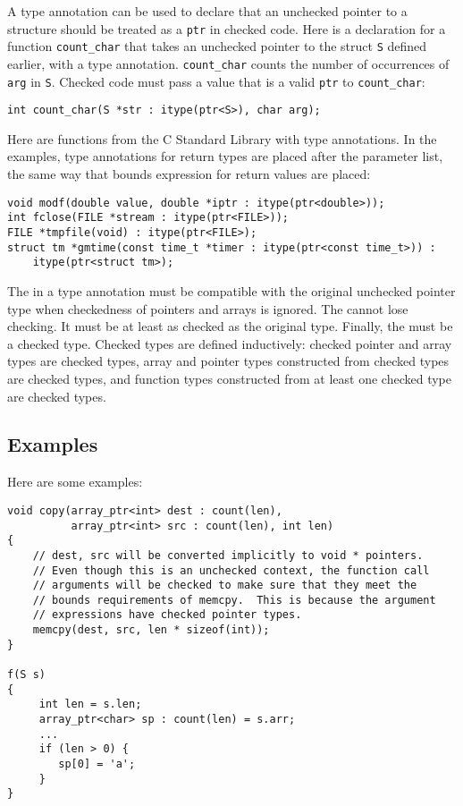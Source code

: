 A type annotation can be used to declare that an unchecked
pointer to a structure should be treated as a \verb+ptr+ in
checked code. Here is a declaration for a function
\verb+count_char+ that takes
an unchecked pointer to the struct \texttt{S} defined earlier,
with a type annotation. \verb+count_char+ counts the number
of occurrences of \verb+arg+ in \verb+S+. Checked code must pass a
value that is a valid \verb+ptr+ to \verb+count_char+:
\begin{lstlisting}
int count_char(S *str : itype(ptr<S>), char arg);
\end{lstlisting}

Here are functions from the C Standard Library with type annotations.
In the examples, type annotations for return types are placed 
after the parameter list, the same way that bounds expression for
return values are placed:
\begin{lstlisting}
void modf(double value, double *iptr : itype(ptr<double>));
int fclose(FILE *stream : itype(ptr<FILE>));
FILE *tmpfile(void) : itype(ptr<FILE>);
struct tm *gmtime(const time_t *timer : itype(ptr<const time_t>)) :
    itype(ptr<struct tm>);
\end{lstlisting}

The  in a type annotation must be compatible
with the original unchecked pointer type when checkedness
of pointers and arrays is ignored. The  cannot
lose checking.  It must be at least as checked as the
original type.  Finally, the  must be
a checked type.   Checked types are defined inductively:
checked pointer and array types are checked types,
array and pointer types constructed from checked types
are checked types, and function types constructed from
at least one checked type are checked types.

\subsection{Examples}
\label{section:bounds-safe-interface-examples}

Here are some examples:
\begin{lstlisting}
void copy(array_ptr<int> dest : count(len),
          array_ptr<int> src : count(len), int len)
{
    // dest, src will be converted implicitly to void * pointers.
    // Even though this is an unchecked context, the function call
    // arguments will be checked to make sure that they meet the
    // bounds requirements of memcpy.  This is because the argument
    // expressions have checked pointer types.
    memcpy(dest, src, len * sizeof(int));
}

f(S s) 
{
     int len = s.len;
     array_ptr<char> sp : count(len) = s.arr;
     ...
     if (len > 0) {
        sp[0] = 'a';
     }
}
\end{lstlisting}

